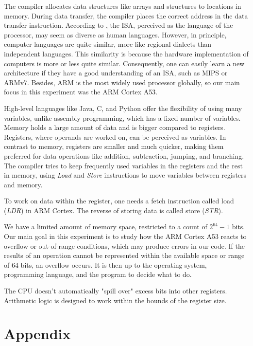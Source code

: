 The compiler allocates data structures like arrays and structures to locations in memory. During data transfer, the compiler places the correct address in the data transfer instruction. According to \cite{patterson2016}, the ISA, perceived as the language of the processor, may seem as diverse as human languages. However, in principle, computer languages are quite similar, more like regional dialects than independent languages. This similarity is because the hardware implementation of computers is more or less quite similar. Consequently, one can easily learn a new architecture if they have a good understanding of an ISA, such as MIPS or ARMv7. Besides, ARM is the most widely used processor globally, so our main focus in this experiment was the ARM Cortex A53.

High-level languages like Java, C, and Python offer the flexibility of using many variables, unlike assembly programming, which has a fixed number of variables. Memory holds a large amount of data and is bigger compared to registers. Registers, where operands are worked on, can be perceived as variables. In contrast to memory, registers are smaller and much quicker, making them preferred for data operations like addition, subtraction, jumping, and branching. The compiler tries to keep frequently used variables in the registers and the rest in memory, using \textit{Load} and \textit{Store} instructions to move variables between registers and memory.

To work on data within the register, one needs a fetch instruction called load (\textit{LDR}) in ARM Cortex. The reverse of storing data is called store (\textit{STR}).

We have a limited amount of memory space, restricted to a count of \(2^{64} - 1\) bits. Our main goal in this experiment is to study how the ARM Cortex A53 reacts to overflow or out-of-range conditions, which may produce errors in our code. If the results of an operation cannot be represented within the available space or range of 64 bits, an overflow occurs. It is then up to the operating system, programming language, and the program to decide what to do.

The CPU doesn’t automatically "spill over" excess bits into other registers. Arithmetic logic is designed to work within the bounds of the register size.

\newpage
\section*{Appendix}

